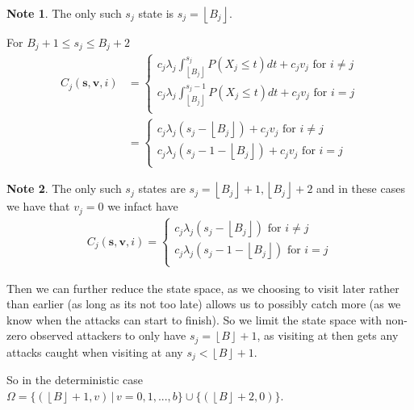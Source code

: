 \documentclass[a4paper,10pt]{article}
\newcommand{\floor}[1]{\left \lfloor #1 \right \rfloor}
\theoremstyle{definition}
\theoremstyle{definition}
\theoremstyle{remark}
\theoremstyle{definition}
\newtheorem*{note}{Note}
\begin{document}
\begin{note}
The only such $s_{j}$ state is $s_{j}=\floor{B_{j}}$.
\end{note}

For $B_{j}+1 \leq s_{j} \leq B_{j}+2$
\begin{align*}
C_{j}(\bm{s},\bm{v},i)&=\begin{cases}
c_{j} \lambda_{j} \int_{\floor{B_{j}}}^{s_{j}} P(X_{j} \leq t) dt + c_{j} v_{j} \text{ for } i \neq j \\
c_{j} \lambda_{j} \int_{\floor{B_{j}}}^{s_{j}-1} P(X_{j} \leq t ) dt +c_{j} v_{j} \text{ for } i=j \\
\end{cases} \\
&=\begin{cases}
c_{j} \lambda_{j}(s_{j}-\floor{B_{j}}) + c_{j} v_{j} \text { for } i \neq j \\
c_{j} \lambda_{j}(s_{j}-1-\floor{B_{j}})+c_{j} v_{j} \text{ for } i=j \\
\end{cases}
\end{align*}

\begin{note}
The only such $s_{j}$ states are $s_{j}=\floor{B_{j}}+1,\floor{B_{j}}+2$
and in these cases we have that $v_{j}=0$ we infact have
\begin{align*}
C_{j}(\bm{s},\bm{v},i)=\begin{cases}
c_{j} \lambda_{j}(s_{j}-\floor{B_{j}}) \text { for } i \neq j \\
c_{j} \lambda_{j}(s_{j}-1-\floor{B_{j}}) \text{ for } i=j \\
\end{cases}
\end{align*}
\end{note}

Then we can further reduce the state space, as we choosing to visit later rather than earlier (as long as its not too late) allows us to possibly catch more (as we know when the attacks can start to finish). So we limit the state space with non-zero observed attackers to only have $s_{j}=\floor{B}+1$, as visiting at then gets any attacks caught when visiting at any $s_{j} < \floor{B}+1$.

So in the deterministic case $\Omega= \{(\floor{B}+1,v) \, | \, v=0,1,...,b \} \cup \{(\floor{B}+2,0) \}$.
\end{document}
